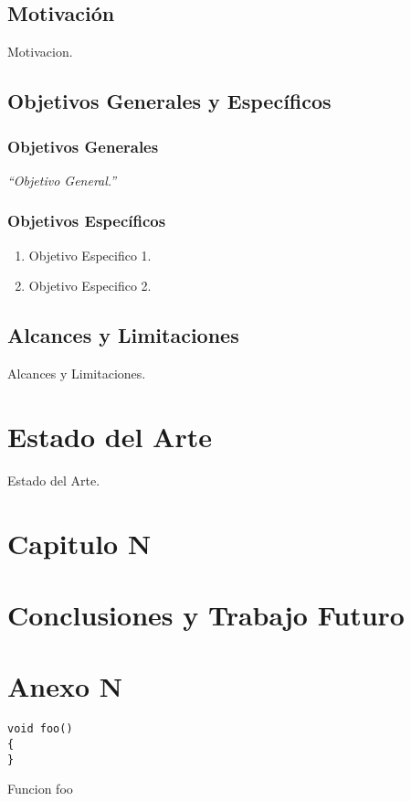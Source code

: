\documentclass[a4paper,12pt,openany,oneside]{book}
\begin{document}
\section{Motivación}

Motivacion.

\newpage

\section{Objetivos Generales y Específicos}

\subsection{Objetivos Generales}

\textit{``Objetivo General.''}

\subsection{Objetivos Específicos}

\begin{enumerate}
 \item Objetivo Especifico 1.
 \item Objetivo Especifico 2.
\end{enumerate}

\section{Alcances y Limitaciones}

Alcances y Limitaciones.

\chapter{Estado del Arte}

Estado del Arte.

\chapter{Capitulo N}

\chapter{Conclusiones y Trabajo Futuro}


%

\appendix
\renewcommand{\appendixname}{Anexo}

\chapter{Anexo N}

\begin{codigo}[f]
\begin{lstlisting}
void foo()
{
}
\end{lstlisting}
\caption{Funcion foo}
\label{fig:funcionFoo}
\end{codigo}
\end{document}
